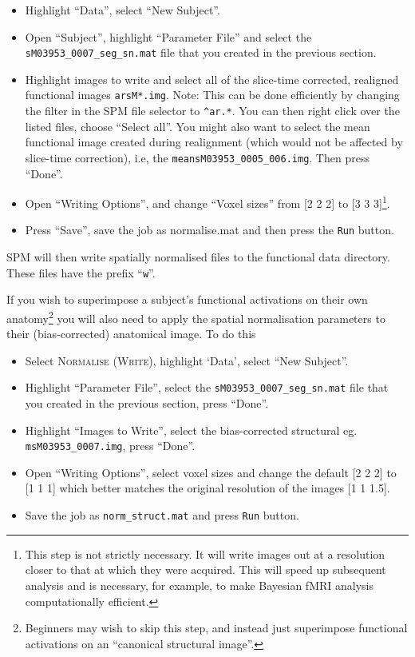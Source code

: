 \begin{itemize}
\item Highlight ``Data'', select ``New Subject''.
\item Open ``Subject'', highlight ``Parameter File'' and select the \texttt{sM03953\_0007\_seg\_sn.mat} file that you created in the previous section.
\item Highlight images to write and select all of the slice-time corrected, realigned functional images \texttt{arsM*.img}. Note: This can be done efficiently by changing the filter in the SPM file selector to \texttt{\textasciicircum ar.*}. You can then right click over the listed files, choose ``Select all''. You might also want to select the mean functional image created during realignment (which would not be affected by slice-time correction), i.e, the \texttt{meansM03953\_0005\_006.img}. Then press ``Done''.
\item Open ``Writing Options'', and change ``Voxel sizes'' from [2 2 2] to [3 3 3]\footnote{This step is not strictly necessary. It will write images out at a resolution closer to that at which they were acquired. This will speed up subsequent analysis and is necessary, for example, to make Bayesian fMRI analysis computationally efficient.}.
\item Press ``Save'', save the job as normalise.mat and then press the \texttt{Run} button.
\end{itemize}
SPM will then write spatially normalised files to the functional data directory. These files have the prefix ``\texttt{w}''.

If you wish to superimpose a subject's functional activations on their own anatomy\footnote{Beginners may wish to skip this step, and instead just superimpose functional activations on an ``canonical structural image''.} you will also need to apply the spatial normalisation parameters to their (bias-corrected) anatomical image. To do this
\begin{itemize}
\item Select \textsc{Normalise (Write)}, highlight `Data', select ``New Subject''.
\item Highlight ``Parameter File'', select the \texttt{sM03953\_0007\_seg\_sn.mat} file that you created in the previous section, press ``Done''.
\item Highlight ``Images to Write'', select the bias-corrected structural eg. \texttt{msM03953\_0007.img}, press ``Done''.
\item Open ``Writing Options'', select voxel sizes and change the default [2 2 2] to [1 1 1] which better matches the original resolution of the images [1 1 1.5].
\item Save the job as \texttt{norm\_struct.mat} and press \texttt{Run} button.
\end{itemize}

